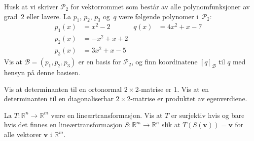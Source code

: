 \documentclass[titlepage,a4paper,12pt,norsk]{IMFeksamen}
\newcommand{\R}{\mathbb{R}}
\renewcommand{\P}{\mathcal{P}} %
\newcommand{\B}{\mathscr{B}} %
\newcommand{\V}[1]{\mathbf{#1}}
\renewcommand{\v}{\V{v}}
\newcommand{\0}{\V{0}}
\begin{document}
\begin{oppgave}
Husk at vi skriver $\P_2$ for vektorrommet som består av alle
polynomfunksjoner av grad~$2$ eller lavere.  La $p_1$, $p_2$, $p_3$
og~$q$ være følgende polynomer i~$\P_2$:
\begin{align*}
p_1(x) &= x^2 - 2    &   q(x) &= 4x^2 + x - 7  \\
p_2(x) &= -x^2 + x + 2 \\
p_3(x) &= 3x^2 + x - 5
\end{align*}
Vis at $\B = (p_1, p_2, p_3)$ er en basis for $\P_2$,
og finn koordinatene $[ q ]_\B$ til $q$ med hensyn på denne basisen.
\end{oppgave}


\begin{oppgave}
Vis at determinanten til en ortonormal $2 \times 2$-matrise er 1. Vis at en determinanten til en diagonaliserbar $2 \times 2$-matrise er produktet av egenverdiene.
\end{oppgave}


\begin{oppgave}
La $T \colon \R^n \to \R^m$ være en lineærtransformasjon.
Vis at $T$ er surjektiv hvis og bare hvis det finnes en
lineærtransformasjon $S \colon \R^m \to \R^n$ slik at
$T(S(\v)) = \v$ for alle vektorer $\v$ i $\R^m$.
\end{oppgave}
\end{document}
